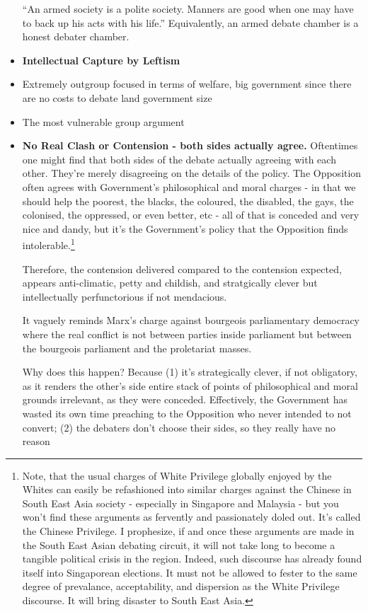 \begin{itemize}
“An armed society is a polite society. Manners are good when one may have to back up his acts with his life.” Equivalently, an armed debate chamber is a honest debater chamber. 



\item \textbf{Intellectual Capture by Leftism}
     \item Extremely outgroup focused in terms of welfare, big government since there are no costs to debate land government size
     \item The most vulnerable group argument


\item \textbf{No Real Clash or Contension - both sides actually agree.} Oftentimes one might find that both sides of the debate actually agreeing with each other. They're merely disagreeing on the details of the policy. The Opposition often agrees with Government's philosophical and moral charges - in that we should help the poorest, the blacks, the coloured, the disabled, the gays, the colonised, the oppressed, or even better, etc - all of that is conceded and very nice and dandy, but it's the Government's policy that the Opposition finds intolerable.\footnote{Note, that the usual charges of White Privilege globally enjoyed by the Whites can easily be refashioned into similar charges against the Chinese in South East Asia society - especially in Singapore and Malaysia - but you won't find these arguments as fervently and passionately doled out. It's called the Chinese Privilege. I prophesize, if and once these arguments are made in the South East Asian debating circuit, it will not take long to become a tangible political crisis in the region. Indeed, such discourse has already found itself into Singaporean elections. It must not be allowed to fester to the same degree of prevalance, acceptability, and dispersion as the White Privilege discourse. It will bring disaster to South East Asia.}
    
    Therefore, the contension delivered compared to the contension expected, appears anti-climatic, petty and childish, and stratgically clever but intellectually perfunctorious if not mendacious.  

    It vaguely reminds Marx's charge against bourgeois parliamentary democracy where the real conflict is not between parties inside parliament but between the bourgeois parliament and the proletariat masses.

    Why does this happen? Because (1) it's strategically clever, if not obligatory, as it renders the other's side entire stack of points of philosophical and moral grounds irrelevant, as they were conceded. Effectively, the Government has wasted its own time preaching to the Opposition who never intended to not convert; (2) the debaters don't choose their sides, so they really have no reason 


\end{itemize}
